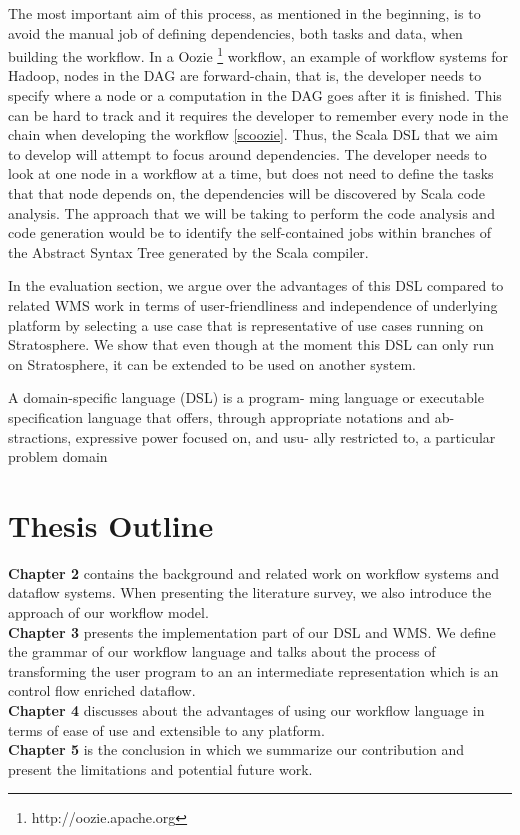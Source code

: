 The most important aim of this process, as mentioned in the beginning, is to avoid the manual job of defining dependencies,  both tasks and data, when building the workflow. In a Oozie \footnote{\label{oozie}http://oozie.apache.org} workflow, an example of workflow systems for Hadoop, nodes in the DAG are forward-chain, that is, the developer needs to specify where a node or a computation in the DAG goes after it is finished. This can be hard to track and it requires the developer to remember every node in the chain when developing the workflow \cref{scoozie}. Thus, the Scala DSL that we aim to develop will attempt to focus around dependencies. The developer needs to look at one node in a workflow at a time, but does not need to define the tasks that that node depends on, the dependencies will be discovered by Scala code analysis. The approach that we will be taking to perform the code analysis and code generation would be to identify the self-contained jobs within branches of the Abstract Syntax Tree generated by the Scala compiler. 

In the evaluation section, we argue over the advantages of this DSL compared to related WMS work in terms of user-friendliness and independence of underlying platform by selecting a use case that is representative of use cases running on Stratosphere. We show that even though at the moment this DSL can only run on Stratosphere, it can be extended to be used on another system. 

\begin{definition}
A domain-specific language (DSL) is a program- ming language or executable specification language that offers, through appropriate notations and ab- stractions, expressive power focused on, and usu- ally restricted to, a particular problem domain \cite{van2000domain}
\label{def:dsl}
\end{definition}

\section{Thesis Outline}
\textbf{Chapter 2} contains the background and related work on workflow systems and dataflow systems. When presenting the literature survey, we also introduce the approach of our workflow model.\\
\textbf{Chapter 3} presents the implementation part of our DSL and WMS. We define the grammar of our workflow language and talks about the process of transforming the user program to an an intermediate representation which is an control flow enriched dataflow.\\
\textbf{Chapter 4} discusses about the advantages of using our workflow language in terms of ease of use and extensible to any platform.\\
\textbf{Chapter 5} is the conclusion in which we summarize our contribution and present the limitations and potential future work. 